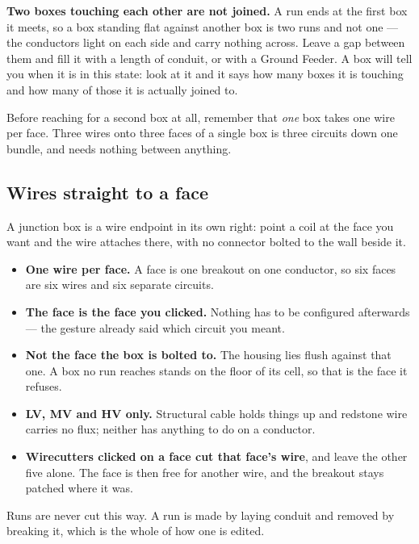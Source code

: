 \begin{iewarning}
\textbf{Two boxes touching each other are not joined.} A run ends at the first box it meets, so a
box standing flat against another box is two runs and not one --- the conductors light on each side
and carry nothing across. Leave a gap between them and fill it with a length of conduit, or with a
Ground Feeder. A box will tell you when it is in this state: look at it and it says how many boxes
it is touching and how many of those it is actually joined to.

Before reaching for a second box at all, remember that \emph{one} box takes one wire per face. Three
wires onto three faces of a single box is three circuits down one bundle, and needs nothing between
anything.
\end{iewarning}

\subsection{Wires straight to a face}

A junction box is a wire endpoint in its own right: point a coil at the face you want and the wire
attaches there, with no connector bolted to the wall beside it.

\begin{itemize}
\item \textbf{One wire per face.} A face is one breakout on one conductor, so six faces are six
      wires and six separate circuits.
\item \textbf{The face is the face you clicked.} Nothing has to be configured afterwards --- the
      gesture already said which circuit you meant.
\item \textbf{Not the face the box is bolted to.} The housing lies flush against that one. A box no
      run reaches stands on the floor of its cell, so that is the face it refuses.
\item \textbf{LV, MV and HV only.} Structural cable holds things up and redstone wire carries no
      flux; neither has anything to do on a conductor.
\item \textbf{Wirecutters clicked on a face cut that face's wire}, and leave the other five alone.
      The face is then free for another wire, and the breakout stays patched where it was.
\end{itemize}

Runs are never cut this way. A run is made by laying conduit and removed by breaking it, which is
the whole of how one is edited.

